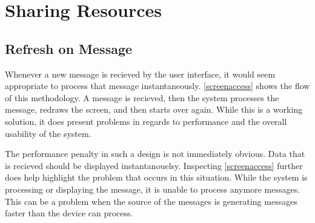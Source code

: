 

\section{Sharing Resources}

\subsection{Refresh on Message}

Whenever a new message is recieved by the user interface, it would seem appropriate to process that message instantaneously. \ref{screenaccess} shows the flow of this methodology. A message is recieved, then the system processes the message, redraws the screen, and then starts over again. While this is a working solution, it does present problems in regards to performance and the overall usability of the system.

The performance penalty in such a design is not immediately obvious. Data that is recieved should be displayed instantanouelsy. Inspecting \ref{screenaccess} further does help highlight the problem that occurs in this situation. While the system is processing or displaying the message, it is unable to process anymore messages. This can be a problem when the source of the messages is generating messages faster than the device can process.




